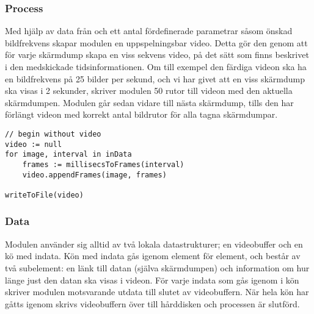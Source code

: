 \subsubsection{Process}
Med hjälp av data från  och ett antal fördefinerade parametrar såsom önskad bildfrekvens skapar modulen en uppspelningsbar video. Detta gör den genom att för varje skärmdump skapa en viss sekvens video, på det sätt som finns beskrivet i den medskickade tidsinformationen. Om till exempel den färdiga videon ska ha en bildfrekvens på 25 bilder per sekund, och vi har givet att en viss skärmdump ska visas i 2 sekunder, skriver modulen 50 rutor till videon med den aktuella skärmdumpen. Modulen går sedan vidare till nästa skärmdump, tills den har förlängt videon med korrekt antal bildrutor för alla tagna skärmdumpar.

\begin{verbatim}
// begin without video
video := null
for image, interval in inData
    frames := millisecsToFrames(interval)
    video.appendFrames(image, frames)

writeToFile(video)
\end{verbatim}

\subsubsection{Data}
Modulen använder sig alltid av två lokala datastrukturer; en videobuffer och en kö med indata. Kön med indata gås igenom element för element, och består av två subelement: en länk till datan (själva skärmdumpen) och information om hur länge just den datan ska visas i videon. För varje indata som gås igenom i kön skriver modulen motsvarande utdata till slutet av videobuffern. När hela kön har gåtts igenom skrivs videobuffern över till hårddisken och processen är slutförd.
